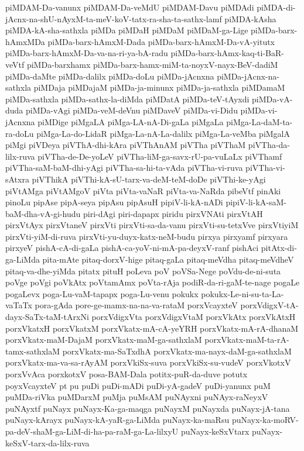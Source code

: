 {piMDAM-Da-vanunx
piMDAM-Da-veMdU
piMDAM-Davu
piMDAdi
piMDA-di-jAcnx-na-shU-nAyxM-ta-meV-koV-tatx-ra-sha-ta-sathx-lamf
piMDA-kAsha
piMDA-kA-sha-sathxla
piMDa
piMDaH
piMDaM
piMDaM-ga-Lige
piMDa-barx-hAmxMDa
piMDa-barx-hAmxM-Dada
piMDa-barx-hAmxM-Da-vA-yitutx
piMDa-barx-hAmxM-Da-va-na-ri-ya-bA-radu
piMDa-barx-hAmx-kaq-ti-BaR-veVtf
piMDa-barxhamx
piMDa-barx-hamx-miM-ta-noyxV-nayx-BeV-dadiM
piMDa-daMte
piMDa-dalilx
piMDa-doLu
piMDa-jAcnxna
piMDa-jAcnx-na-sathxla
piMDaja
piMDajaM
piMDa-ja-minunx
piMDa-ja-sathxla
piMDamaM
piMDa-sathxla
piMDa-sathx-la-diMda
piMDatA
piMDa-teV-tAyxdi
piMDa-vA-duda
piMDa-vAgi
piMDa-veM-deVnu
piMDaveV
piMDa-vi-Didu
piMDa-vi-jAcnxna
piMDige
piMgaLA
piMga-LA-nA-Di-gaLa
piMgaLa
piMga-La-daM-ta-ra-doLu
piMga-La-do-LidaR
piMga-La-nA-La-dalilx
piMga-La-veMba
piMgalA
piMgi
piVDeya
piVThA-dhi-kAra
piVThAnAM
piVTha
piVThaM
piVTha-da-lilx-ruva
piVTha-de-De-yoLeV
piVTha-liM-ga-savx-rU-pa-vuLaLx
piVThamf
piVTha-saM-baM-dhi-yAgi
piVTha-sa-hi-ta-vAda
piVTha-vi-ruva
piVTha-vi-sAtxra
piVThikA
piVThi-kA-sU-tarx-va-deM-teM-doDe
piVThi-ke-yAgi
piVtAMga
piVtAMgoV
piVta
piVta-vaNaR
piVta-va-NaRda
pibeVtf
pinAki
pinoLu
pipAse
pipA-seya
pipAsu
pipAsuH
pipiV-li-kA-nADi
pipiV-li-kA-saM-baM-dha-vA-gi-hudu
piri-dAgi
piri-dapapx
piridu
pirxVNAti
pirxVtAH
pirxVtAyx
pirxVtaneV
pirxVti
pirxVti-sa-da-vanu
pirxVti-su-tetxVve
pirxVtiyiM
pirxVti-yiM-di-ruva
pirxVti-yu-duyx-katx-neM-budu
pirxya
pirxyamf
pirxyara
pirxyeV
pishA-cA-di-gaLa
pishA-ca-yoV-ni-mA-pa-deyxV-ranf
pishAci
pitAtx-di-ga-LiMda
pita-mAte
pitaq-dorxV-hige
pitaq-gaLa
pitaq-meVdha
pitaq-meVdheV
pitaq-va-dhe-yiMda
pitatx
pituH
poLeva
poV
poVSa-Nege
poVdu-de-ni-suta
poVge
poVgi
poVkAtx
poVtamAmx
poVta-rAja
podiR-da-ri-gaM-te-nage
pogaLe
pogaLevx
poga-Lu-vaM-tapapx
poga-Lu-venu
pokukx
pokukx-Le-ni-su-ta-La-vaTaTx
pora-gAda
pore-ge-mamx-na-na-va-rataM
porxVcayxteV
porxVdigxV-tA-dayx-SaTx-taM-tArxNi
porxVdigxVta
porxVdigxVtaM
porxVkAtx
porxVkAtxH
porxVkatxH
porxVkatxM
porxVkatx-mA-cA-yeYRH
porxVkatx-mA-rA-dhanaM
porxVkatx-maM-DajaM
porxVkatx-maM-ga-sathxlaM
porxVkatx-maM-ta-rA-tamx-sathxlaM
porxVkatx-ma-SaTxdhA
porxVkatx-ma-nayx-daM-ga-sathxlaM
porxVkatx-ma-va-sa-rAyAM
porxVkiSx-suva
porxVkiSx-su-vudeV
porxVkotxV
porxVvAca
porxkotxV
posa-BAM-Dala
potitx-puR-da-duve
potutx
poyxVcayxteV
pt
pu
puDi
puDi-mADi
puDi-yA-gadeV
puDi-yanunx
puM
puMDa-riVka
puMDarxM
puMja
puMsAM
puNAyxni
puNAyx-raNeyxV
puNAyxtf
puNayx
puNayx-Ka-ga-maqga
puNayxM
puNayxda
puNayx-jA-tana
puNayx-kArayx
puNayx-kA-yaR-ga-LiMda
puNayx-ka-maRsu
puNayx-ka-moRV-pa-deV-shaM-ga-LiM-di-ha-pa-raM-ga-La-lilxyU
puNayx-keSxVtarx
puNayx-keSxV-tarx-da-lilx-ruva
}

